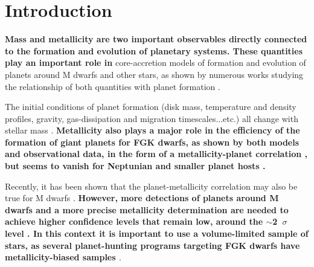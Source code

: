 \documentclass[structabstract]{aa}
\begin{document}


   \maketitle
%

\section{Introduction}
\label{intro}

\textbf{Mass and metallicity are two important observables directly connected to the formation and evolution of planetary systems. These quantities play an important role in} core-accretion models of formation and evolution of planets around M dwarfs and other stars, as shown by numerous works studying the relationship of both quantities with planet formation \citep[e.g.][]{Ida-2005,Kornet-2006, Kennedy-2008a, Thommes-2008, Alibert-2011, Mordasini-2012}. 


The initial conditions of planet formation (disk mass, temperature and density profiles, gravity, gas-dissipation and migration timescales...etc.) all change with stellar mass \citep[e.g.][]{Ida-2005, Kornet-2006, Kennedy-2008a, Alibert-2011}.  \textbf{Metallicity also plays a major role in the efficiency of the formation of giant planets for FGK dwarfs, as shown by both models \citep[e.g.][]{Ida-2004b} and observational data, \textbf{in the form of a metallicity-planet correlation} \citep[e.g.][]{Gonzalez-1997,Santos-2004b,Fischer-2005, Sousa-2011b, Mayor-2011}, but seems to vanish for Neptunian and smaller planet hosts \citep[]{Sousa-2008,Bouchy-2009, Ghezzi-2010,Sousa-2011b}.}



Recently, it has been shown that the planet-metallicity correlation may also be true for M dwarfs \citep[e.g.][]{Bonfils-2007,Johnson-2009, Schlaufman-2010, Rojas-Ayala-2012, Terrien-2012}. \textbf{However, more detections of planets around M dwarfs and a more precise metallicity determination are needed to achieve higher confidence levels that remain low, around the $\sim$2~$\sigma$ level \citep{Bonfils-2007,Schlaufman-2010}. In this context it is important to use a volume-limited sample of stars, as several planet-hunting programs targeting FGK dwarfs have metallicity-biased samples \citep[e.g.][]{Baranne-1996,Fischer-2005b,Melo-2007} }.
\end{document}
